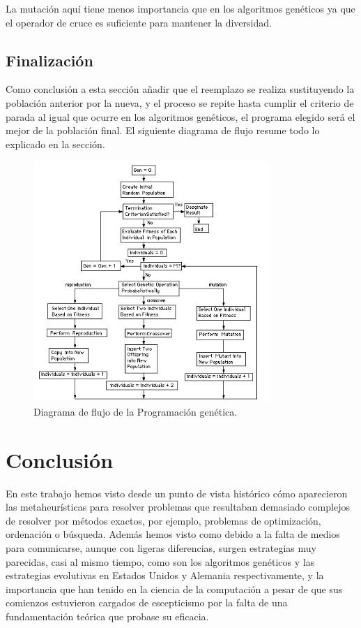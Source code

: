 \documentclass[12pt]{article} \usepackage[utf8x]{inputenc}
\begin{document}
La mutación aquí tiene menos importancia que en los algoritmos
genéticos ya que el operador de cruce es suficiente para mantener la
diversidad.

\subsection{Finalización}

Como conclusión a esta sección añadir que el reemplazo se realiza
sustituyendo la población anterior por la nueva, y el proceso se
repite hasta cumplir el criterio de parada al igual que ocurre en los
algoritmos genéticos, el programa elegido será el mejor de la
población final. El siguiente diagrama de flujo resume todo lo
explicado en la sección.

\begin{figure}[H]
  \centering
  \includegraphics[width=0.8\textwidth]{FlowchartGP.PNG}
  \caption{Diagrama de flujo de la Programación genética.}
  \label{fig:dfd:1}
\end{figure}

\section{Conclusión}

En este trabajo hemos visto desde un punto de vista histórico cómo aparecieron las 
metaheurísticas para resolver problemas que resultaban demasiado complejos de resolver 
por métodos exactos, por ejemplo, problemas de optimización, ordenación o búsqueda. 
Además hemos visto como debido a la falta de medios para comunicarse, aunque con ligeras 
diferencias, surgen estrategias muy parecidas, casi al mismo tiempo, como son los algoritmos 
genéticos y las estrategias evolutivas en Estados Unidos y Alemania respectivamente, y la importancia 
que han tenido en la ciencia de la computación a pesar de que sus comienzos estuvieron 
cargados de escepticismo por la falta de una fundamentación teórica que probase su eficacia. \\
\end{document}
